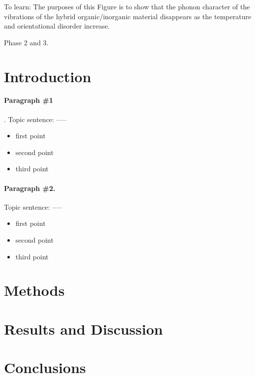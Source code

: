 \documentclass[journal=cmatex,manuscript=article]{achemso}
\begin{document}
To learn: The purposes of this Figure is to show that the phonon character of the vibrations of the hybrid organic/inorganic material disappears as the temperature and orientational disorder increase. 


\newpage 

Phase 2 and 3. 

\section{Introduction}

\paragraph{Paragraph \#1}. 
Topic sentence: ----- 

\begin{itemize}
	\item first point
	\item second point 
	\item third point 
\end{itemize}


\paragraph{Paragraph \#2. }
Topic sentence: ----- 

\begin{itemize}
	\item first point
	\item second point 
	\item third point 
\end{itemize}


\section{Methods}

\section{Results and Discussion}

\section{Conclusions}

\newpage

\end{document}
